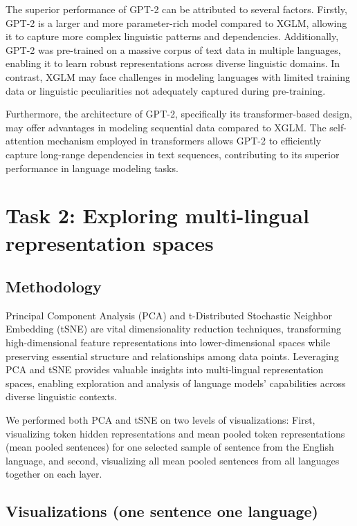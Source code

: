 \documentclass[11pt]{article}
\begin{document}
The superior performance of GPT-2 can be attributed to several factors. Firstly, GPT-2 is a larger and more parameter-rich model compared to XGLM, allowing it to capture more complex linguistic patterns and dependencies. Additionally, GPT-2 was pre-trained on a massive corpus of text data in multiple languages, enabling it to learn robust representations across diverse linguistic domains. In contrast, XGLM may face challenges in modeling languages with limited training data or linguistic peculiarities not adequately captured during pre-training.

Furthermore, the architecture of GPT-2, specifically its transformer-based design, may offer advantages in modeling sequential data compared to XGLM. The self-attention mechanism employed in transformers allows GPT-2 to efficiently capture long-range dependencies in text sequences, contributing to its superior performance in language modeling tasks.

\section{Task 2: Exploring multi-lingual representation spaces}

\subsection{Methodology}

Principal Component Analysis (PCA) and t-Distributed Stochastic Neighbor Embedding (tSNE) are vital dimensionality reduction techniques, transforming high-dimensional feature representations into lower-dimensional spaces while preserving essential structure and relationships among data points. Leveraging PCA and tSNE provides valuable insights into multi-lingual representation spaces, enabling exploration and analysis of language models' capabilities across diverse linguistic contexts.

We performed both PCA and tSNE on two levels of visualizations:
First, visualizing token hidden representations and mean pooled token representations (mean pooled sentences) for one selected sample of sentence from the English language, and second, visualizing all mean pooled sentences from all languages together on each layer.

\subsection{Visualizations (one sentence one language)}
\end{document}
